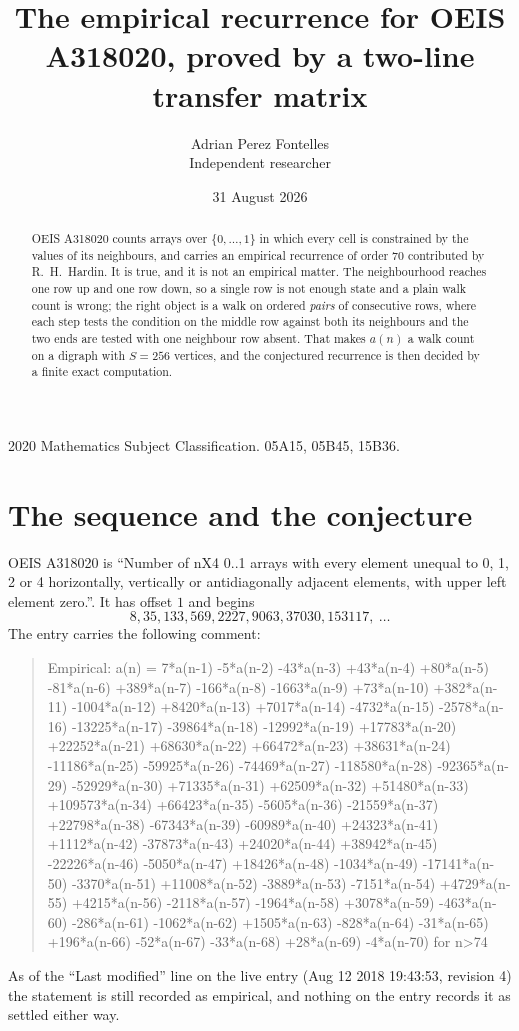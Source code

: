 \documentclass[11pt,a4paper]{article}
\title{The empirical recurrence for OEIS A318020, proved by a two-line transfer matrix}
\author{Adrian Perez Fontelles\\ \small Independent researcher}
\date{31 August 2026}
\theoremstyle{plain}
\theoremstyle{definition}
\begin{document}
\maketitle

\begin{abstract}
OEIS A318020 counts arrays over $\{0,\dots,1\}$ in which every cell is constrained by the
values of its neighbours, and carries an empirical recurrence of order $70$ contributed
by R.~H.~Hardin. It is true, and it is not an empirical matter. The neighbourhood reaches one
row up and one row down, so a single row is not enough state and a plain walk count
is wrong; the right object is a walk on ordered \emph{pairs} of consecutive rows, where
each step tests the condition on the middle row against both its neighbours and the two
ends are tested with one neighbour row absent. That makes $a(n)$ a walk count on a digraph
with $S=256$ vertices, and the conjectured recurrence is then decided by a finite exact
computation.
\end{abstract}

\noindent\small 2020 Mathematics Subject Classification. 05A15, 05B45, 15B36.\normalsize

\section{The sequence and the conjecture}

OEIS A318020 is ``Number of nX4 0..1 arrays with every element unequal to 0, 1, 2 or 4 horizontally, vertically or antidiagonally adjacent elements, with upper left element zero.''. It has offset $1$ and begins
\[
8, 35, 133, 569, 2227, 9063, 37030, 153117,\ \dots
\]
The entry carries the following comment:
\begin{quote}\small
Empirical: a(n) = 7*a(n-1) -5*a(n-2) -43*a(n-3) +43*a(n-4) +80*a(n-5) -81*a(n-6) +389*a(n-7) -166*a(n-8) -1663*a(n-9) +73*a(n-10) +382*a(n-11) -1004*a(n-12) +8420*a(n-13) +7017*a(n-14) -4732*a(n-15) -2578*a(n-16) -13225*a(n-17) -39864*a(n-18) -12992*a(n-19) +17783*a(n-20) +22252*a(n-21) +68630*a(n-22) +66472*a(n-23) +38631*a(n-24) -11186*a(n-25) -59925*a(n-26) -74469*a(n-27) -118580*a(n-28) -92365*a(n-29) -52929*a(n-30) +71335*a(n-31) +62509*a(n-32) +51480*a(n-33) +109573*a(n-34) +66423*a(n-35) -5605*a(n-36) -21559*a(n-37) +22798*a(n-38) -67343*a(n-39) -60989*a(n-40) +24323*a(n-41) +1112*a(n-42) -37873*a(n-43) +24020*a(n-44) +38942*a(n-45) -22226*a(n-46) -5050*a(n-47) +18426*a(n-48) -1034*a(n-49) -17141*a(n-50) -3370*a(n-51) +11008*a(n-52) -3889*a(n-53) -7151*a(n-54) +4729*a(n-55) +4215*a(n-56) -2118*a(n-57) -1964*a(n-58) +3078*a(n-59) -463*a(n-60) -286*a(n-61) -1062*a(n-62) +1505*a(n-63) -828*a(n-64) -31*a(n-65) +196*a(n-66) -52*a(n-67) -33*a(n-68) +28*a(n-69) -4*a(n-70) for n>74
\end{quote}
As of the ``Last modified'' line on the live entry (Aug 12 2018 19:43:53, revision 4) the statement is
still recorded as empirical, and nothing on the entry records it as settled either way.
\end{document}
